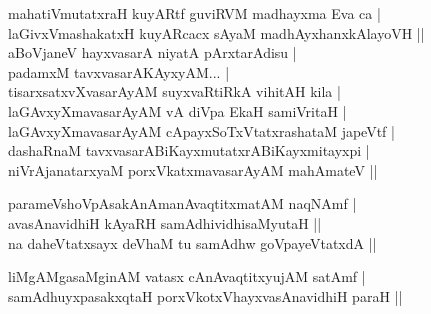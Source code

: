 \begin{entry}
\medskip
\begin{shl}
mahatiVmutatxraH kuyARtf guviRVM madhayxma Eva ca |\\[1pt]
laGivxVmashakatxH kuyARcacx sAyaM madhAyxhanxkAlayoVH ||\\[3pt]
aBoVjaneV hayxvasarA niyatA pArxtarAdisu |\\[1pt]
padamxM tavxvasarAKAyxyAM... |\\[3pt]
tisarxsatxvXvasarAyAM suyxvaRtiRkA vihitAH kila |\\[1pt]
laGAvxyXmavasarAyAM vA diVpa EkaH samiVritaH |\\[3pt]
laGAvxyXmavasarAyAM cApayxSoTxVtatxrashataM japeVtf |\\[1pt]
dashaRnaM tavxvasarABiKayxmutatxrABiKayxmitayxpi |\\[3pt]
niVrAjanatarxyaM porxVkatxmavasarAyAM mahAmateV ||
\end{shl}
\medskip
{}
\smallskip
{}
\end{entry}

\begin{entry}
\smallskip
\begin{shl}
parameVshoVpAsakAnAmanAvaqtitxmatAM naqNAmf |\\[1pt]
avasAnavidhiH kAyaRH samAdhividhisaMyutaH ||\\[3pt]
na daheVtatxsayx deVhaM tu samAdhw goVpayeVtatxdA ||
\end{shl}
\medskip
{}
\smallskip
\begin{shl}
liMgAMgasaMginAM vatasx cAnAvaqtitxyujAM satAmf |\\[1pt]
samAdhuyxpasakxqtaH porxVkotxVhayxvasAnavidhiH paraH ||
\end{shl}
\medskip
{}
\smallskip
{}
\end{entry}

